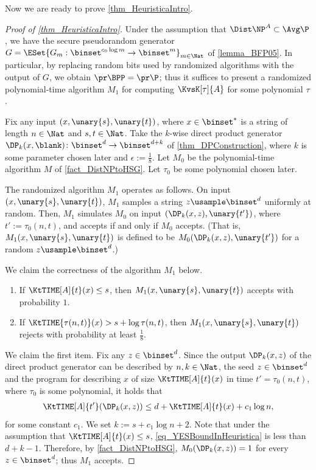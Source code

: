 \documentclass{toc}
\begin{document}
Now we are ready to prove \cref{thm_HeuristicaIntro}.
\begin{proof}
  [Proof of \cref{thm_HeuristicaIntro}]
  Under the assumption that $\Dist\NP^A \subset \Avg\P$, we have the secure pseudorandom generator
  $G = \ESet{G_m : \binset^{c_0 \log m} \to \binset^m }_{m \in \Nat}$
  of \cref{lemma_BFP05}.
  In particular,
  by replacing random bits used by randomized algorithms
  with the output of $G$,
  we obtain $\pr\BPP = \pr\P$;
  thus
  it suffices to present a randomized polynomial-time algorithm $M_1$
  for computing $\KvsK[\tau]{A}$ for some polynomial $\tau$.


  Fix any input $(x, \unary{s}, \unary{t})$, where $x \in \binset^*$ is a string of length $n \in \Nat$
  and $s, t \in \Nat$.
  Take the $k$-wise direct product generator $\DP_k(x, \blank) \colon \binset^d \to \binset^{d + k}$ of \cref{thm_DPConstruction},
  where $k$ is some parameter chosen later and $\epsilon := \frac{1}{8}$.
  Let $M_0$ be the polynomial-time algorithm $M$ of \cref{fact_DistNPtoHSG}.
  Let $\tau_0$ be some polynomial chosen later.


  The randomized algorithm $M_1$ operates as follows.
  On input $(x, \unary{s}, \unary{t})$,
  $M_1$ samples a string $z \usample \binset^d$ uniformly at random.
  Then,
  $M_1$ simulates $M_0$ on input $(\DP_k(x, z), \unary{t'})$, where $t' := \tau_0(n, t)$,
  and accepts if and only if $M_0$ accepts.
  (That is, $M_1(x, \unary{s}, \unary{t})$ is defined to be $M_0(\DP_k(x, z), \unary{t'})$ for a random $z \usample \binset^d$.)

  We claim the correctness of the algorithm $M_1$ below.
  \begin{claim}
    \label{claim_CorrectnessOfHeuristica}
    \hspace{0em}
    \begin{enumerate}
      \item
            If $\KtTIME[A]{t}(x) \le s$,
            then $M_1(x, \unary{s}, \unary{t})$ accepts with probability $1$.
      \item
            If $\KtTIME{\tau(n, t)}(x) > s + \log \tau(n, t)$,
            then $M_1(x, \unary{s}, \unary{t})$ rejects with probability at least $\frac{1}{8}$.
    \end{enumerate}
  \end{claim}

  We claim the first item.
  Fix any ${z} \in \binset^d$.
  Since the output $\DP_k(x, {z})$ of
  the direct product generator
  can be described by
  $n, k \in \Nat$,
  the seed ${z} \in \binset^d$
  and
  the program for describing $x$ of size $\KtTIME[A]{t}(x)$
  in time $t' = \tau_0(n, t)$,
  where $\tau_0$ is some polynomial,
  it holds that
  \begin{align}
    \label{eq_YESBoundInHeuristica}
    \KtTIME[A]{t'}(\DP_k(x, {z})) \le d + \KtTIME[A]{t}(x) + c_1 \log n,
  \end{align}
  for some constant $c_1$.
  We set $k := s + c_1 \log n + 2$.
  Note that under the assumption that $\KtTIME[A]{t}(x) \le s$, \cref{eq_YESBoundInHeuristica} is less than $d + k - 1$.
  Therefore, by \cref{fact_DistNPtoHSG},
  $M_0(\DP_k(x, {z})) = 1$ for every ${z} \in \binset^d$;
  thus $M_1$ accepts.


\end{proof}
\end{document}

